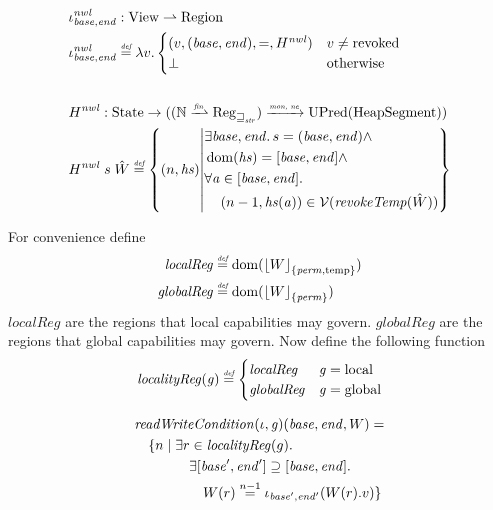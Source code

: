 \documentclass{article}
\DeclarePairedDelimiter\floor{\lfloor}{\rfloor}
\newcommand{\parfun}{\rightharpoonup}
\newcommand{\finparfun}{\xrightharpoonup{\textit{\tiny{fin}}}}
\newcommand{\monnefun}{\xrightarrow{\textit{\tiny{mon, ne}}}}
\newcommand{\fun}{\rightarrow}
\newcommand{\defeq}{\stackrel{\textit{\tiny{def}}}{=}}
\newcommand{\nequal}[1][n]{\stackrel{\tiny{#1}}{=}}
\DeclareMathOperator{\dom}{dom}
\newcommand{\var}[1]{\mathit{#1}}
\newcommand{\hs}{\var{hs}}
\newcommand{\gl}{\var{g}}
\newcommand{\addr}{\var{a}}
\newcommand{\start}{\var{base}}
\newcommand{\addrend}{\var{end}}
\newcommand{\perm}{\var{perm}}
\newcommand{\plainfun}[2]{
  \ifthenelse{\equal{#2}{}}
             {\mathit{#1}}
             {\mathit{#1}(#2)}
}
\newcommand{\writeCond}[1]{\plainfun{readWriteCondition}{#1}}
\newcommand{\revokeTemp}[1]{\plainfun{revokeTemp}{#1}}
\newcommand{\erase}[2]{\floor*{#1}_{\{#2\}}}
\newcommand{\futurestr}{\mathbin{\sqsupseteq}_{\var{str}}}
\newcommand{\asmType}{\plaindom{AsmType}}
\newcommand{\plaindom}[1]{\mathrm{#1}}
\newcommand{\HeapSegments}{\plaindom{HeapSegment}}
\newcommand{\nats}{\mathbb{N}}
\newcommand{\States}{\plaindom{State}}
\newcommand{\Regions}{\plaindom{Region}}
\newcommand{\Reg}{\plaindom{Reg}}
\newcommand{\Regstr}{\Reg_{\futurestr}}
\newcommand{\UPred}[1]{\plaindom{UPred}(#1)}
\newcommand{\Views}{\plaindom{View}}
\newcommand{\intr}[2]{\mathcal{#1}}
\newcommand{\valueintr}[1]{\intr{V}{#1}}
\newcommand{\stdvr}{\valueintr{\asmType}}
\newcommand{\npair}[2][n]{\left(#1,#2 \right)}
\newcommand{\plainperm}[1]{\mathrm{#1}}
\newcommand{\local}{\plainperm{local}}
\newcommand{\glob}{\plainperm{global}}
\newcommand{\localReg}{\var{localReg}}
\newcommand{\globalReg}{\var{globalReg}}
\newcommand{\plainview}[1]{\mathrm{#1}}
\newcommand{\temp}{\plainview{temp}}
\newcommand{\revoked}{\plainview{revoked}}
\begin{document}
\begin{align*}
  &\iota_{\start,\addrend}^{\var{nwl}} : \Views \parfun \Regions \\
  &\iota_{\start,\addrend}^{\var{nwl}} \defeq \lambda v \ldotp
    \begin{cases}
      (v,(\start,\addrend),=,H^{\var{nwl}}) & v \neq \revoked \\
      \bot & \text{otherwise}
\end{cases}
\\ \\
  &H^{\var{nwl}} : \States \fun ((\nats \finparfun \Regstr) \monnefun \UPred{\HeapSegments})\\
  &H^{\var{nwl}} \; s \;\hat{W} \defeq \left\{\npair{\hs} \middle|
    \begin{aligned}
      &\exists \start,\addrend \ldotp s = (\start,\addrend) \land \\
      &\dom(\hs) = [\start,\addrend] \land \\
      &\forall \addr \in [\start,\addrend] \ldotp \\
      &\quad \npair[n-1]{\hs(\addr)} \in \stdvr(\revokeTemp{\hat{W}}) %
    \end{aligned}
  \right\}
\end{align*}

For convenience define
\begin{align*}
  \localReg & \defeq \dom(\erase{W}{\perm,\temp}) \\
  \globalReg & \defeq \dom(\erase{W}{\perm})
\end{align*}
$\localReg$ are the regions that local capabilities may govern. $\globalReg$ are the regions that global capabilities may govern. Now define the following function
\[
  \var{localityReg}(\gl) \defeq 
  \begin{cases}
    \localReg & \gl = \local \\
    \globalReg & \gl = \glob
  \end{cases}
\]

\begin{align*}
    & \writeCond{}(\iota,\gl)(\start,\addrend,W) =  \\
    & \quad \begin{aligned}[t]
              \{ n \mid & \;\exists r \in \var{localityReg}(g) \ldotp \\
              & \;\quad \exists [\start',\addrend'] \supseteq [\start,\addrend] \ldotp \\
              & \;\qquad W(r)\nequal[n-1] \iota_{\start',\addrend'}(W(r).v) \}
            \end{aligned}
\end{align*}
\end{document}
